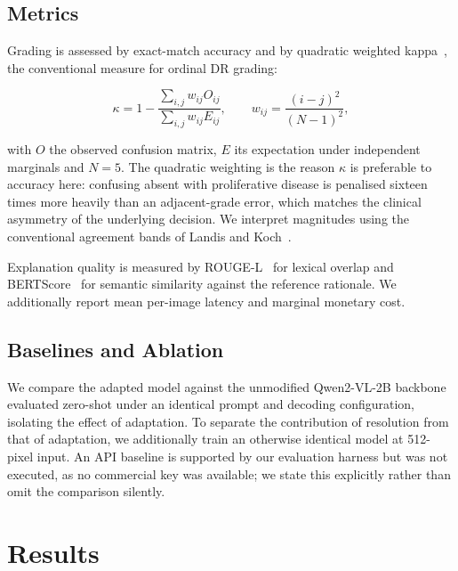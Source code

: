 \documentclass[conference]{IEEEtran}
\begin{document}
\subsection{Metrics}
Grading is assessed by exact-match accuracy and by quadratic weighted
kappa~\cite{cohen1968weighted}, the conventional measure for ordinal DR grading:

\begin{equation}
\kappa = 1 - \frac{\sum_{i,j} w_{ij} O_{ij}}{\sum_{i,j} w_{ij} E_{ij}},
\qquad
w_{ij} = \frac{(i-j)^{2}}{(N-1)^{2}},
\label{eq:qwk}
\end{equation}

with $O$ the observed confusion matrix, $E$ its expectation under independent
marginals and $N = 5$. The quadratic weighting is the reason $\kappa$ is
preferable to accuracy here: confusing absent with proliferative disease is
penalised sixteen times more heavily than an adjacent-grade error, which matches
the clinical asymmetry of the underlying decision. We interpret magnitudes using
the conventional agreement bands of Landis and Koch~\cite{landis1977measurement}.

Explanation quality is measured by ROUGE-L~\cite{lin2004rouge} for lexical
overlap and BERTScore~\cite{zhang2020bertscore} for semantic similarity against
the reference rationale. We additionally report mean per-image latency and
marginal monetary cost.

\subsection{Baselines and Ablation}
We compare the adapted model against the unmodified Qwen2-VL-2B backbone
evaluated zero-shot under an identical prompt and decoding configuration,
isolating the effect of adaptation. To separate the contribution of resolution
from that of adaptation, we additionally train an otherwise identical model at
512-pixel input. An API baseline is supported by our evaluation harness but was
not executed, as no commercial key was available; we state this explicitly rather
than omit the comparison silently.

\section{Results}
\label{sec:results}
\end{document}
